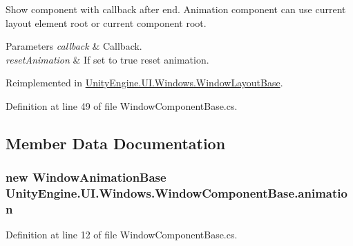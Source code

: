 Show component with callback after end. Animation component can use current layout element root or current component root. 


\begin{DoxyParams}{Parameters}
{\em callback} & Callback.\\
\hline
{\em reset\+Animation} & If set to {\ttfamily true} reset animation.\\
\hline
\end{DoxyParams}


Reimplemented in \hyperlink{class_unity_engine_1_1_u_i_1_1_windows_1_1_window_layout_base_abe9d6b720b99d3f1d02fb17ce2aeb542}{Unity\+Engine.\+U\+I.\+Windows.\+Window\+Layout\+Base}.



Definition at line 49 of file Window\+Component\+Base.\+cs.



\subsection{Member Data Documentation}
\hypertarget{class_unity_engine_1_1_u_i_1_1_windows_1_1_window_component_base_a417979b06ca588075c970f0979be327c}{}
\subsubsection[{animation}]{\setlength{\rightskip}{0pt plus 5cm}new {\bf Window\+Animation\+Base} Unity\+Engine.\+U\+I.\+Windows.\+Window\+Component\+Base.\+animation}\label{class_unity_engine_1_1_u_i_1_1_windows_1_1_window_component_base_a417979b06ca588075c970f0979be327c}


Definition at line 12 of file Window\+Component\+Base.\+cs.

\hypertarget{class_unity_engine_1_1_u_i_1_1_windows_1_1_window_component_base_a6733fb2bce75f137ede6db940e4a869f}{}
